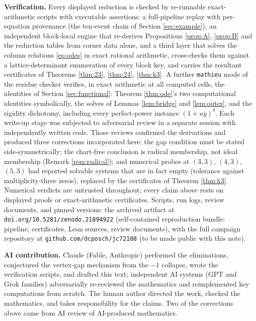 \documentclass[11pt]{article}
\theoremstyle{definition}
\theoremstyle{remark}
\begin{document}
\medskip
\noindent\textbf{Verification.} Every displayed reduction is checked by re-runnable exact-arithmetic scripts with executable assertions: a full-pipeline replay with per-equation provenance (the ten-event chain of Section \ref{sec:example}), an independent block-local engine that re-derives Propositions \ref{prop:A}, \ref{prop:B} and the reduction tables from corner data alone, and a third layer that solves the column relations \eqref{eq:odes} in exact rational arithmetic, cross-checks them against a lattice-determinant enumeration of every block key, and carries the resultant certificates of Theorems \ref{thm:23}, \ref{thm:24}, \ref{thm:k3}. A further \texttt{mathieu} mode of the residue checker verifies, in exact arithmetic at all computed cells, the identities of Section \ref{sec:functional}: Theorem \ref{thm:ode}'s two computational identities symbolically, the solves of Lemmas \ref{lem:bridge} and \ref{lem:outer}, and the rigidity dichotomy, including every perfect-power instance $(1+uy)^\delta$. Each write-up stage was subjected to adversarial review in a separate session with independently written code. Those reviews confirmed the derivations and produced three corrections incorporated here: the gap condition must be stated side-symmetrically; the chart-free conclusion is radical membership, not ideal membership (Remark \ref{rem:radical}); and numerical probes at $(3,3)$, $(4,3)$, $(5,3)$ had reported solvable systems that are in fact empty (tolerance against multiplicity-three zeros), replaced by the certificates of Theorem \ref{thm:k3}. Numerical verdicts are untrusted throughout; every claim above rests on displayed proofs or exact-arithmetic certificates. Scripts, run logs, review documents, and pinned versions: the archived artifact at \texttt{doi.org/10.5281/zenodo.21894922} (self-contained reproduction bundle: pipeline, certificates, Lean sources, review documents), with the full campaign repository at \texttt{github.com/dcposch/jc72108} (to be made public with this note).

\medskip
\noindent\textbf{AI contribution.} Claude (Fable, Anthropic) performed the eliminations, conjectured the vertex-gap mechanism from the $-1$ collapse, wrote the verification scripts, and drafted this text; independent AI systems (GPT and Grok families) adversarially re-reviewed the mathematics and reimplemented key computations from scratch. The human author directed the work, checked the mathematics, and takes responsibility for the claims. Two of the corrections above came from AI review of AI-produced mathematics.
\end{document}
